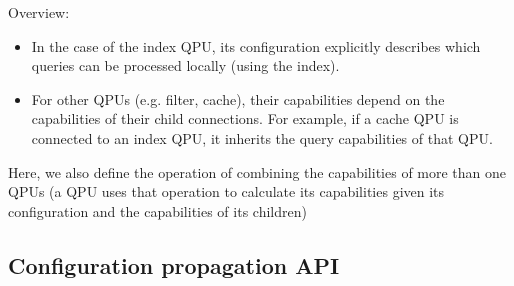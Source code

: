 Overview:
\begin{itemize}
  \item In the case of the index QPU, its configuration explicitly describes which queries can be processed locally
  (using the index).
  \item For other QPUs (e.g. filter, cache), their capabilities depend on the capabilities of their child connections.
  For example, if a cache QPU is connected to an index QPU, it inherits the query capabilities of that QPU.
\end{itemize}

Here, we also define the operation of combining the capabilities of more than one QPUs (a QPU uses that operation to
calculate its capabilities given its configuration and the capabilities of its children)

\subsection{Configuration propagation API}


